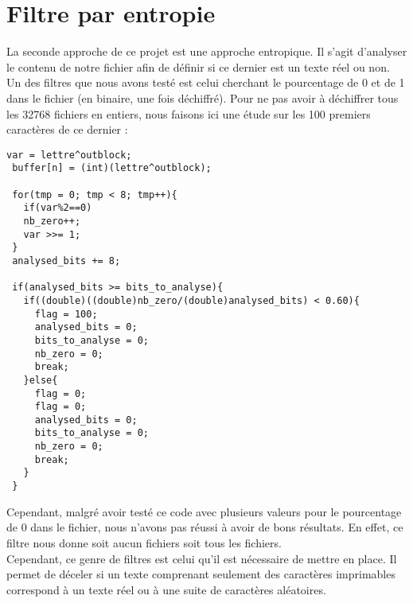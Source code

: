 \section{Filtre par entropie}
La seconde approche de ce projet est une approche entropique. Il s'agit d'analyser le contenu de notre fichier afin de définir si ce dernier est un texte réel ou non.\\
Un des filtres que nous avons testé est celui cherchant le pourcentage de 0 et de 1 dans le fichier (en binaire, une fois déchiffré). Pour ne pas avoir à déchiffrer tous les 32768 fichiers en entiers, nous faisons ici une étude sur les 100 premiers caractères de ce dernier :
\begin{lstlisting}[style=customc]
 var = lettre^outblock;
 buffer[n] = (int)(lettre^outblock);
 
 for(tmp = 0; tmp < 8; tmp++){
   if(var%2==0)
   nb_zero++;
   var >>= 1;
 }
 analysed_bits += 8;

 if(analysed_bits >= bits_to_analyse){
   if((double)((double)nb_zero/(double)analysed_bits) < 0.60){
     flag = 100;
     analysed_bits = 0;
     bits_to_analyse = 0;
     nb_zero = 0;
     break;
   }else{
     flag = 0;
     flag = 0;
     analysed_bits = 0;
     bits_to_analyse = 0;
     nb_zero = 0;
     break;
   }
 }
\end{lstlisting}
Cependant, malgré avoir testé ce code avec plusieurs valeurs pour le pourcentage de 0 dans le fichier, nous n'avons pas réussi à avoir de bons résultats. En effet, ce filtre nous donne soit aucun fichiers soit tous les fichiers.\\
Cependant, ce genre de filtres est celui qu'il est nécessaire de mettre en place. Il permet de déceler si un texte comprenant seulement des caractères imprimables correspond à un texte réel ou à une suite de caractères aléatoires.